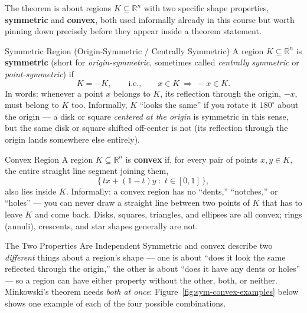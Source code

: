 The theorem is about regions $K \subseteq \mathbb{R}^n$ with two specific shape properties, \textbf{symmetric} and \textbf{convex}, both used informally already in this course but worth pinning down precisely before they appear inside a theorem statement.

\begin{defbox}{Symmetric Region (Origin-Symmetric / Centrally Symmetric)}
A region $K \subseteq \mathbb{R}^n$ is \textbf{symmetric} (short for \emph{origin-symmetric}, sometimes called \emph{centrally symmetric} or \emph{point-symmetric}) if
$$
K = -K, \qquad \text{i.e.,} \qquad x \in K \ \Longrightarrow\ -x \in K.
$$
In words: whenever a point $x$ belongs to $K$, its reflection through the origin, $-x$, must belong to $K$ too. Informally, $K$ ``looks the same'' if you rotate it $180^\circ$ about the origin --- a disk or square \emph{centered at the origin} is symmetric in this sense, but the same disk or square shifted off-center is not (its reflection through the origin lands somewhere else entirely).
\end{defbox}

\begin{defbox}{Convex Region}
A region $K \subseteq \mathbb{R}^n$ is \textbf{convex} if, for every pair of points $x, y \in K$, the entire straight line segment joining them,
$$
\{\, t x + (1-t) y \;:\; t \in [0,1] \,\},
$$
also lies inside $K$. Informally: a convex region has no ``dents,'' ``notches,'' or ``holes'' --- you can never draw a straight line between two points of $K$ that has to leave $K$ and come back. Disks, squares, triangles, and ellipses are all convex; rings (annuli), crescents, and star shapes generally are not.
\end{defbox}

\begin{rmkbox}{The Two Properties Are Independent}
Symmetric and convex describe two \emph{different} things about a region's shape --- one is about ``does it look the same reflected through the origin,'' the other is about ``does it have any dents or holes'' --- so a region can have either property without the other, both, or neither. Minkowski's theorem needs \emph{both at once}: Figure~\ref{fig:sym-convex-examples} below shows one example of each of the four possible combinations.
\end{rmkbox}

